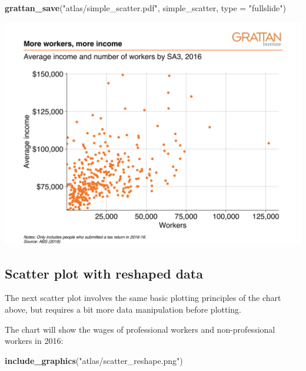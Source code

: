 \documentclass[
]{book}
\newenvironment{Shaded}{\begin{snugshade}}{\end{snugshade}}
\newcommand{\DataTypeTok}[1]{\textcolor[rgb]{0.13,0.29,0.53}{#1}}
\newcommand{\KeywordTok}[1]{\textcolor[rgb]{0.13,0.29,0.53}{\textbf{#1}}}
\newcommand{\NormalTok}[1]{#1}
\newcommand{\StringTok}[1]{\textcolor[rgb]{0.31,0.60,0.02}{#1}}
\begin{document}
\begin{Shaded}
\begin{Highlighting}[]
\KeywordTok{grattan\_save}\NormalTok{(}\StringTok{"atlas/simple\_scatter.pdf"}\NormalTok{, simple\_scatter, }\DataTypeTok{type =} \StringTok{"fullslide"}\NormalTok{)}
\end{Highlighting}
\end{Shaded}

\includegraphics[width=44.44in]{atlas/simple_scatter}

\hypertarget{scatter-plot-with-reshaped-data}{%
\subsection{Scatter plot with reshaped data}\label{scatter-plot-with-reshaped-data}}

The next scatter plot involves the same basic plotting principles of the chart above, but requires a bit more data manipulation before plotting.

The chart will show the wages of professional workers and non-professional workers in 2016:

\begin{Shaded}
\begin{Highlighting}[]
\KeywordTok{include\_graphics}\NormalTok{(}\StringTok{"atlas/scatter\_reshape.png"}\NormalTok{)}
\end{Highlighting}
\end{Shaded}
\end{document}
